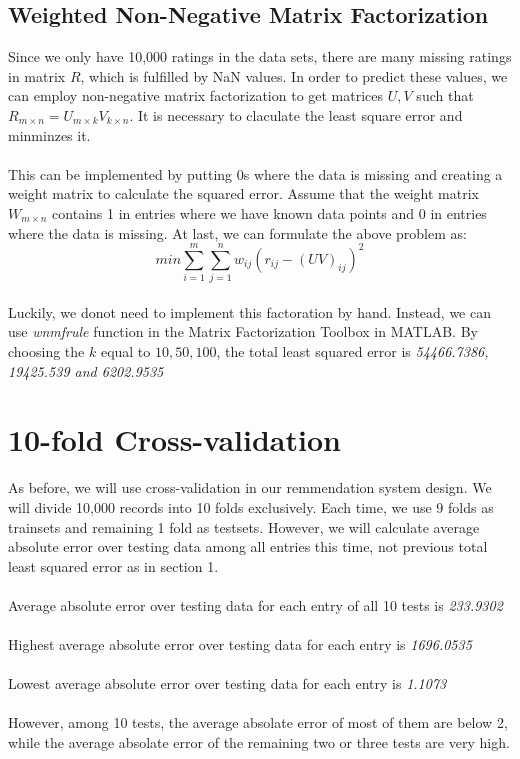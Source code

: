 \documentclass{article}
\begin{document}
\subsection{Weighted Non-Negative Matrix Factorization}
Since we only have 10,000 ratings in the data sets, there are many missing ratings in matrix $R$, which is fulfilled by NaN values. In order to predict these values, we can employ non-negative matrix factorization to get matrices $U, V$ such that $R_{m \times n}=U_{m \times k}V_{k \times n}$. It is necessary to claculate the least square error and minminzes it.\\
\\
This can be implemented by putting 0s where the data is missing and creating a weight matrix to calculate the squared error. Assume that the weight matrix $W_{m \times n}$ contains 1 in entries where we have known data points and 0 in entries where the data is missing. At last, we can formulate the above problem as:
\begin{equation}
min\sum_{i=1}^{m}\sum_{j=1}^{n}w_{ij}{(r_{ij}-{(UV)}_{ij})}^2
\end{equation}
\\
Luckily, we donot need to implement this factoration by hand. Instead, we can use \emph{wnmfrule} function in the Matrix Factorization Toolbox in MATLAB. By choosing the $k$ equal to $10, 50, 100$, the total least squared error is \emph{54466.7386, 19425.539 and 6202.9535}
\section{10-fold Cross-validation}
As before, we will use cross-validation in our remmendation system design. We will divide 10,000 records into 10 folds exclusively. Each time, we use 9 folds as trainsets and remaining 1 fold as testsets. However, we will calculate average absolute error over testing data among all entries this time, not previous total least squared error as in section 1.\\
\\
Average absolute error over testing data for each entry of all 10 tests is \emph{233.9302}\\
\\
Highest average absolute error over testing data for each entry is \emph{1696.0535}\\
\\
Lowest average absolute error over testing data for each entry is \emph{1.1073}\\
\\
However, among 10 tests, the average absolate error of most of them are below 2, while the average absolate error of the remaining two or three tests are very high.
\end{document}
